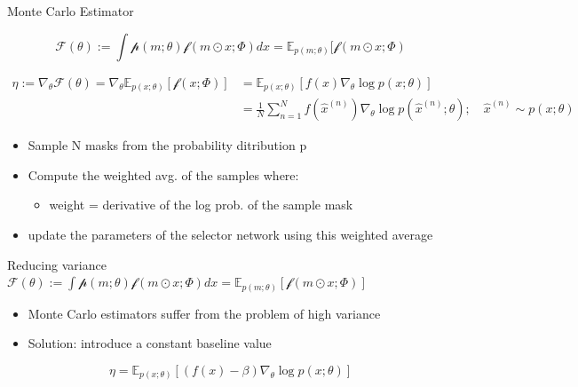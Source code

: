\documentclass[11pt,compress,t,notes=noshow, aspectratio=169, xcolor=table]{beamer}
\begin{document}
\begin{frame}{Monte Carlo Estimator}
   
\begin{equation*}
     \mathcal{F}(\theta):= \int \mathcal{p}(m;\theta)\mathcal{f}(m\odot x;\Phi)dx = \mathbb{E}_{p(m;\theta)}[\mathcal{f}(m\odot x;\Phi)
\end{equation*}
   
\begin{align*}
     \eta := \nabla_\theta \mathcal{F}(\theta) = \nabla_\theta \mathbb{E}_{p(x;\theta)}[\mathcal{f}(x;\Phi)] &= \mathbb{E}_{p(x;\theta)}[f(x)\nabla_\theta \log p(x;\theta)]\\
     &=\frac{1}{N}\sum\limits_{n=1}^N f(\hat{x}^{(n)})\nabla_\theta \log p(\hat{x}^{(n)};\theta); \quad \hat{x}^{(n)} \sim p(x;\theta)
\end{align*}



    \begin{itemize}
        \item Sample N masks from the probability ditribution p
        \item Compute the weighted avg. of the samples where:
        \begin{itemize}
            \item weight = derivative of the log prob. of the sample mask
        \end{itemize}
        \item update the parameters of the selector network using this weighted average
    \end{itemize}
\end{frame}

\begin{frame}{Reducing variance}
  \centering  $\mathcal{F}(\theta):= \int \mathcal{p}(m;\theta)\mathcal{f}(m\odot x;\Phi)dx = \mathbb{E}_{p(m;\theta)}[\mathcal{f}(m\odot x;\Phi)]$
  \bigskip
  \begin{itemize}
      \item Monte Carlo estimators suffer from the problem of high variance
      \item Solution: introduce a constant baseline value
  \end{itemize}
  \bigskip
 
 
 \begin{equation*}
     \eta = \mathbb{E}_{p(x;\theta)}[(f(x) - \beta)\nabla_\theta \log p(x;\theta)]
 \end{equation*} 
  
  
  
\end{frame}
\end{document}
